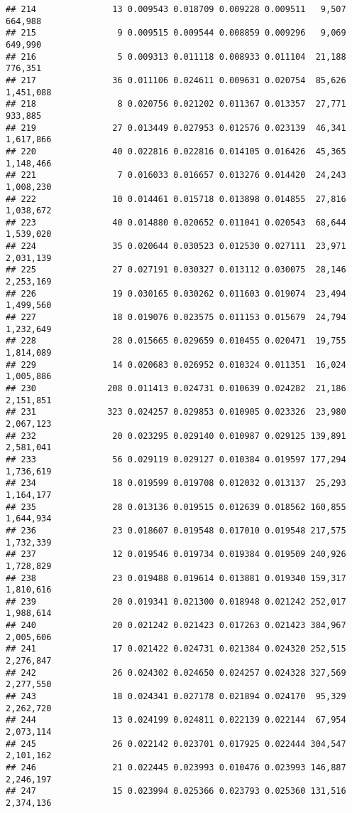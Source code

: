\documentclass[]{article}
\begin{document}
\begin{verbatim}
## 214               13 0.009543 0.018709 0.009228 0.009511   9,507   664,988
## 215                9 0.009515 0.009544 0.008859 0.009296   9,069   649,990
## 216                5 0.009313 0.011118 0.008933 0.011104  21,188   776,351
## 217               36 0.011106 0.024611 0.009631 0.020754  85,626 1,451,088
## 218                8 0.020756 0.021202 0.011367 0.013357  27,771   933,885
## 219               27 0.013449 0.027953 0.012576 0.023139  46,341 1,617,866
## 220               40 0.022816 0.022816 0.014105 0.016426  45,365 1,148,466
## 221                7 0.016033 0.016657 0.013276 0.014420  24,243 1,008,230
## 222               10 0.014461 0.015718 0.013898 0.014855  27,816 1,038,672
## 223               40 0.014880 0.020652 0.011041 0.020543  68,644 1,539,020
## 224               35 0.020644 0.030523 0.012530 0.027111  23,971 2,031,139
## 225               27 0.027191 0.030327 0.013112 0.030075  28,146 2,253,169
## 226               19 0.030165 0.030262 0.011603 0.019074  23,494 1,499,560
## 227               18 0.019076 0.023575 0.011153 0.015679  24,794 1,232,649
## 228               28 0.015665 0.029659 0.010455 0.020471  19,755 1,814,089
## 229               14 0.020683 0.026952 0.010324 0.011351  16,024 1,005,886
## 230              208 0.011413 0.024731 0.010639 0.024282  21,186 2,151,851
## 231              323 0.024257 0.029853 0.010905 0.023326  23,980 2,067,123
## 232               20 0.023295 0.029140 0.010987 0.029125 139,891 2,581,041
## 233               56 0.029119 0.029127 0.010384 0.019597 177,294 1,736,619
## 234               18 0.019599 0.019708 0.012032 0.013137  25,293 1,164,177
## 235               28 0.013136 0.019515 0.012639 0.018562 160,855 1,644,934
## 236               23 0.018607 0.019548 0.017010 0.019548 217,575 1,732,339
## 237               12 0.019546 0.019734 0.019384 0.019509 240,926 1,728,829
## 238               23 0.019488 0.019614 0.013881 0.019340 159,317 1,810,616
## 239               20 0.019341 0.021300 0.018948 0.021242 252,017 1,988,614
## 240               20 0.021242 0.021423 0.017263 0.021423 384,967 2,005,606
## 241               17 0.021422 0.024731 0.021384 0.024320 252,515 2,276,847
## 242               26 0.024302 0.024650 0.024257 0.024328 327,569 2,277,550
## 243               18 0.024341 0.027178 0.021894 0.024170  95,329 2,262,720
## 244               13 0.024199 0.024811 0.022139 0.022144  67,954 2,073,114
## 245               26 0.022142 0.023701 0.017925 0.022444 304,547 2,101,162
## 246               21 0.022445 0.023993 0.010476 0.023993 146,887 2,246,197
## 247               15 0.023994 0.025366 0.023793 0.025360 131,516 2,374,136

\end{verbatim}
\end{document}
